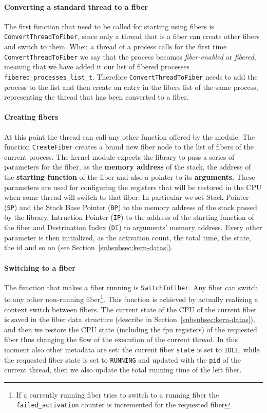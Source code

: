 \documentclass[a4paper,10pt]{article}
\begin{document}
  \paragraph{Converting a standard thread to a fiber}
    The first function that need to be called for starting using fibers is \lstinline{ConvertThreadToFiber}, since only a thread that is a fiber can create other fibers and switch to them. When a thread of a process calls for the first time \lstinline{ConvertThreadToFiber} we say that the process becomes \textit{fiber-enabled} or \textit{fibered}, meaning that we have added it our list of fibered processes \lstinline{fibered_processes_list_t}. Therefore \lstinline{ConvertThreadToFiber} needs to add the process to the list and then create an entry in the fibers list of the same process, representing the thread that has been converted to a fiber.

  \paragraph{Creating fibers}
    At this point the thread can call any other function offered by the module. The function \lstinline{CreateFiber} creates a brand new fiber node to the list of fibers of the current process. The kernel module expects the library to pass a series of parameters for the fiber, as the \textbf{memory address} of the stack, the address of the \textbf{starting function} of the fiber and also a pointer to its \textbf{arguments}. These parameters are used for configuring the registers that will be restored in the CPU when some thread will switch to that fiber. In particular we set Stack Pointer (\texttt{SP}) and the Stack Base Pointer (\texttt{BP}) to the memory address of the stack passed by the library, Intruction Pointer (\texttt{IP}) to the address of the starting function of the fiber and Destrination Index (\texttt{DI}) to arguments’ memory address. Every other parameter is then initialized, as the activation count, the total time, the state, the id and so on (see Section~\ref{subsubsec:kern-datas}).

  \paragraph{Switching to a fiber}
    The function that makes a fiber running is \lstinline{SwitchToFiber}. Any fiber can switch to any other non-running fiber\footnote{If a currently running fiber tries to switch to a running fiber the \lstinline{failed_activation} counter is incremented for the requested fiber}. This function is achieved by actually realizing a context switch between fibers. The current state of the CPU of the current fiber is saved in the fiber data structure (describe in Section~\ref{subsubsec:kern-datas}), and then we restore the CPU state (including the fpu registers) of the requested fiber thus changing the flow of the execution of the current thread. In this moment also other metadata are set: the current fiber \lstinline{state} is set to \texttt{IDLE}, while the requested fiber state is set to \texttt{RUNNING} and updated with the \texttt{pid} of the current thread, then we also update the total running time of the left fiber.
\end{document}
